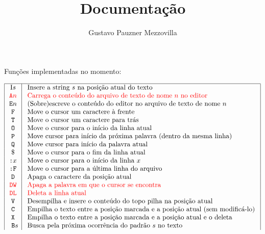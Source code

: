 \documentclass{article}
\title{Documentação}
\author{Gustavo Pauzner Mezzovilla}
\begin{document}
\maketitle

Funções implementadas no momento:

$$
\begin{array}{|c|l|}
\hline \text {I}s & \text { Insere a string } s \text { na posição atual do texto } \\
\color{red}\texttt {A}n & \color{red}\text { Carrega o conteúdo do arquivo de texto de nome } n \text { no editor } \\
\texttt{E}n & \text { (Sobre)escreve o conteúdo do editor no arquivo de texto de nome } n \\
\texttt{ F } & \text { Move o cursor um caractere à frente } \\
\texttt{ T } & \text { Move o cursor um caractere para trás } \\
\texttt{O} & \text { Move o cursor para o início da linha atual } \\
\texttt{P} & \text { Move cursor para início da próxima palavra (dentro da mesma linha) } \\
\texttt{ Q } & \text { Move cursor para início da palavra atual } \\
\$ & \text { Move o cursor para o fim da linha atual } \\
\texttt{:}x & \text { Move o cursor para o início da linha } x \\
\texttt{:F} & \text { Move o cursor para a última linha do arquivo } \\
\texttt{D} & \text { Apaga o caractere da posição atual } \\
\color{red}\texttt{DW} & \color{red}\text { Apaga a palavra em que o cursor se encontra } \\
\color{red}\texttt{DL} & \color{red}\text { Deleta a linha atual } \\
\texttt{ V } & \text { Desempilha e insere o conteúdo do topo pilha na posição atual } \\
\texttt{ C } & \text { Empilha o texto entre a posição marcada e a posição atual (sem modificá-lo) } \\
\texttt{ X } & \text { Empilha o texto entre a posição marcada e a posição atual e o deleta } \\
\texttt{ B}s & \text { Busca pela próxima ocorrência do padrão } s \text { no texto } \\

\end{array}$$
\end{document}
